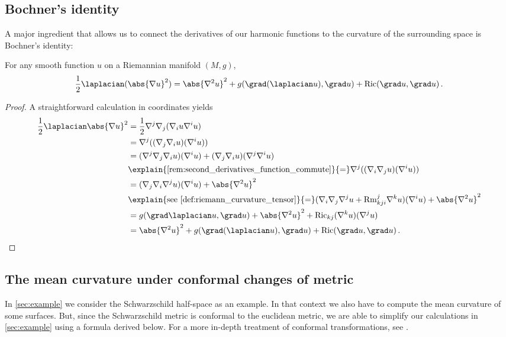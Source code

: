 \documentclass[titlepage,numbers=noenddot,oneside,%
cleardoublepage=empty,paper=a4,fontsize=11pt,%
english,%
]{scrartcl}
\newcommand*{\mathfullstop}{\,.}
\newcommand{\Ricci}{\mathrm{Ric}} %
\newcommand{\riemanncurvature}{\mathrm{Rm}} %
\begin{document}
\subsection{Bochner's identity}
A major ingredient that allows us to connect the derivatives of our harmonic functions to the curvature of the surrounding space is Bochner's identity:
\begin{lemma}\label{lem:bochner_identity}
    For any smooth function \( u \) on a Riemannian manifold \( (M,g) \),
    \begin{equation*}
        \frac{1}{2}\laplacian(\abs{\nabla u}^2)=\abs{\nabla^2 u}^2+g(\grad (\laplacian u),\grad u)+\Ricci(\grad u, \grad u)\mathfullstop
    \end{equation*} 
\end{lemma}
\begin{proof}
    A straightforward calculation in coordinates yields
    \begin{equation*}
        \begin{aligned}[t]
            \frac{1}{2}\laplacian \abs{\nabla u}^2&=\frac{1}{2}\nabla^j\nabla_j(\nabla_i u \nabla^i u)\\
            &=\nabla^j((\nabla_j \nabla_i u)(\nabla^i u))\\
            &=(\nabla^j \nabla_j\nabla_i u)(\nabla^i u)+(\nabla_j \nabla_i u)(\nabla^j \nabla^i u)\\
            &\explain{\text{\cref{rem:second_derivatives_function_commute}}}{=}\nabla^j((\nabla_i \nabla_j u)(\nabla^i u))\\
            &=(\nabla_j \nabla_i \nabla^j u)(\nabla^i u)+\abs{\nabla^2 u}^2\\
            &\explain{\text{see \cref{def:riemann_curvature_tensor}}}{=}(\nabla_i \nabla_j \nabla^j u+\riemanncurvature_{kji}^j \nabla^k u)(\nabla^i u)+\abs{\nabla^2 u}^2\\
            &=g(\grad \laplacian u,\grad u)+\abs{\nabla^2 u}^2+\Ricci_{kj}(\nabla^k u)(\nabla^j u)\\
            &=\abs{\nabla^2 u}^2+g(\grad (\laplacian u),\grad u)+\Ricci(\grad u, \grad u)\mathfullstop
        \end{aligned}
    \end{equation*}
\end{proof}
\subsection{The mean curvature under conformal changes of metric}\label{sec:conformal_changes_of_metric}
In \cref{sec:example} we consider the Schwarzschild half-space as an example. In that context we also have to compute the mean curvature of some surfaces. But, since the Schwarzschild metric is conformal to the euclidean metric, we are able to simplify our calculations in \cref{sec:example} using a formula derived below. For a more in-depth treatment of conformal transformations, see \cite{curryIntroductionConformalGeometry2015}.
\end{document}
